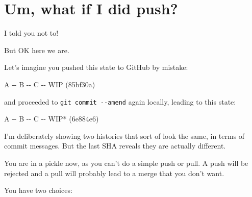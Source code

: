 \documentclass[
]{book}
\newenvironment{Shaded}{\begin{snugshade}}{\end{snugshade}}
\newcommand{\NormalTok}[1]{#1}
\begin{document}
\section{Um, what if I did push?}\label{um-what-if-i-did-push}

I told you not to!

But OK here we are.

Let's imagine you pushed this state to GitHub by mistake:

\begin{Shaded}
\begin{Highlighting}[]
\NormalTok{A {-}{-} B {-}{-} C {-}{-} WIP (85bf30a)}
\end{Highlighting}
\end{Shaded}

and proceeded to \texttt{git\ commit\ -\/-amend} again locally, leading to this state:

\begin{Shaded}
\begin{Highlighting}[]
\NormalTok{A {-}{-} B {-}{-} C {-}{-} WIP* (6e884e6)}
\end{Highlighting}
\end{Shaded}

I'm deliberately showing two histories that sort of look the same, in terms of commit messages.
But the last SHA reveals they are actually different.

You are in a pickle now, as you can't do a simple push or pull.
A push will be rejected and a pull will probably lead to a merge that you don't want.

You have two choices:
\end{document}
